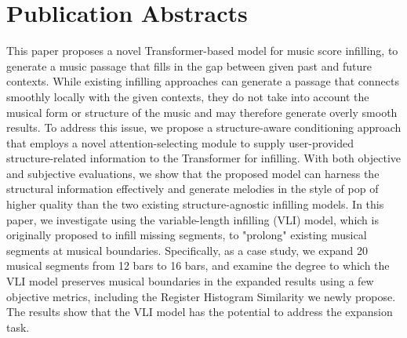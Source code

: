 

\section{Publication Abstracts}
{This paper proposes a novel Transformer-based model for music score infilling, to generate a music passage that fills in the gap between given past and future contexts. While existing infilling approaches can generate a passage that connects smoothly locally with the given contexts, they do not take into account the musical form or structure of the music and may therefore generate overly smooth results. To address this issue, we propose a structure-aware conditioning approach that employs a novel attention-selecting module to supply user-provided structure-related information to the Transformer for infilling. With both objective and subjective evaluations, we show that the proposed model can harness the structural information effectively and generate melodies in the style of pop of higher quality than the two existing structure-agnostic infilling models.}
{In this paper, we investigate using the variable-length infilling (VLI) model, which is originally proposed to infill missing segments, to "prolong" existing musical segments at musical boundaries. Specifically, as a case study, we expand 20 musical segments from 12 bars to 16 bars, and examine the degree to which the VLI model preserves musical boundaries in the expanded results using a few objective metrics, including the Register Histogram Similarity we newly propose. The results show that the VLI model has the potential to address the expansion task.}

